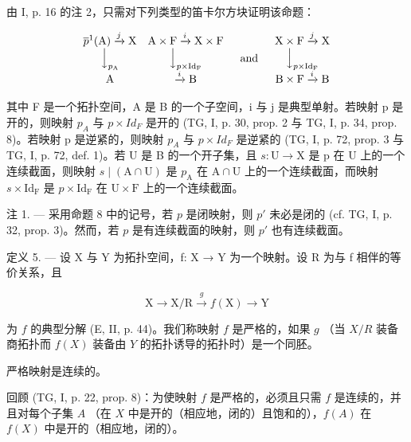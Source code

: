 由 I, p. 16 的注 2，只需对下列类型的笛卡尔方块证明该命题：

\[
\begin{array}{c c} \overline {{p}} ^ {1} (\mathrm {A}) \xrightarrow {j} \mathrm{X} & \mathrm {A} \times \mathrm{F} \xrightarrow {i} \mathrm{X} \times \mathrm{F} \\ \Big \downarrow_ {p _ {\mathrm {A}}} & \Big \downarrow_ {p \times \mathrm {Id}_{\mathrm {F}}} \\ \mathrm {A} & \xrightarrow {i} \mathrm {B} \end{array} \quad\text {and} \quad \begin{array}{c} \mathrm {X} \times \mathrm {F} \xrightarrow {j} \mathrm {X} \\ \Big \downarrow_ {p \times \mathrm {Id}_{\mathrm {F}}} \\ \mathrm {B} \times \mathrm {F} \xrightarrow {i} \mathrm {B} \end{array}
\]

其中 F 是一个拓扑空间，A 是 B 的一个子空间，i 与 j 是典型单射。若映射 p 是开的，则映射 \(p_{A}\) 与 \(p \times Id_{F}\) 是开的 (TG, I, p. 30, prop. 2 与 TG, I, p. 34, prop. 8)。若映射 p 是逆紧的，则映射 \(p_{A}\) 与 \(p \times Id_{F}\) 是逆紧的 (TG, I, p. 72, prop. 3 与 TG, I, p. 72, def. 1)。若 U 是 B 的一个开子集，且 \(s\colon\mathrm{U}\to\mathrm{X}\) 是 p 在 U 上的一个连续截面，则映射 \(s\mid(\mathrm{A}\cap\mathrm{U})\) 是 \(p_{\mathrm{A}}\) 在 \(\mathrm{A}\cap\mathrm{U}\) 上的一个连续截面，而映射 \(s\times\mathrm{Id}_{\mathrm{F}}\) 是 \(p\times\mathrm{Id}_{\mathrm{F}}\) 在 \(\mathrm{U}\times\mathrm{F}\) 上的一个连续截面。

注 1. --- 采用命题 8 中的记号，若 \(p\) 是闭映射，则 \(p'\) 未必是闭的 (cf. TG, I, p. 32, prop. 3)。然而，若 \(p\) 是有连续截面的映射，则 \(p'\) 也有连续截面。

定义 5. --- 设 X 与 Y 为拓扑空间，f: X → Y 为一个映射。设 R 为与 f 相伴的等价关系，且

\[
\mathrm{X} \rightarrow \mathrm{X} / \mathrm{R} \xrightarrow {g} f (\mathrm{X}) \rightarrow \mathrm{Y}
\]

为 \(f\) 的典型分解 (E, II, p. 44)。我们称映射 \(f\) 是严格的，如果 \(g\) （当 \(X/R\) 装备商拓扑而 \(f(X)\) 装备由 \(Y\) 的拓扑诱导的拓扑时）是一个同胚。

严格映射是连续的。

回顾 (TG, I, p. 22, prop. 8)：为使映射 \(f\) 是严格的，必须且只需 \(f\) 是连续的，并且对每个子集 \(A\) （在 \(X\) 中是开的（相应地，闭的）且饱和的），\(f(A)\) 在 \(f(X)\) 中是开的（相应地，闭的）。

